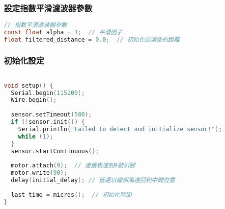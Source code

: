 \subsubsection{設定指數平滑濾波器參數}
\begin{lstlisting}[language=C]
// 指數平滑濾波器參數
const float alpha = 1;  // 平滑因子
float filtered_distance = 0.0;  // 初始化過濾後的距離

\end{lstlisting}

\subsubsection{初始化設定}
\begin{lstlisting}[language=C]

void setup() {
  Serial.begin(115200);
  Wire.begin();
  
  sensor.setTimeout(500);
  if (!sensor.init()) {
    Serial.println("Failed to detect and initialize sensor!");
    while (1);
  }
  sensor.startContinuous();
  
  motor.attach(9);  // 連接馬達到9號引腳
  motor.write(90);
  delay(initial_delay); // 延遲以確保馬達回到中間位置
  
  last_time = micros();  // 初始化時間
}

\end{lstlisting}


